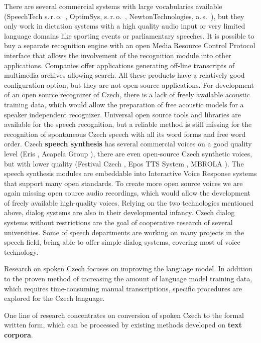 \begin{multicols}{2}
There are several commercial systems with large vocabularies available (SpeechTech s.\,r.\,o.~\cite{Note11}, OptimSys, s.\,r.\,o.~\cite{Note12}, NewtonTechnologies, a.\,s.~\cite{Note13}), but they only work in dictation systems with a high quality audio input or very limited language domains like sporting events or parliamentary speeches. It is possible to buy a separate recognition engine with an open Media Resource Control Protocol  interface that allows the involvement of the recognition module into other applications. Companies offer applications generating off-line transcripts of multimedia archives allowing search. All these products have a relatively good configuration option, but they are not open source applications. For development of an open source recognizer of Czech, there is a lack of freely available acoustic training data, which would allow the preparation of free acoustic models for a speaker independent recognizer. Universal open source tools and libraries are available for the speech recognition, but a reliable method is still missing for the recognition of spontaneous Czech speech with all its word forms and free word order.
Czech \textbf{speech synthesis} has several commercial voices on a good quality level (Eris \cite{Note11}, Acapela Group \cite{Note14}), there are even open-source Czech synthetic voices, but with lower quality (Festival Czech \cite{Note15}, Epos TTS System \cite{Note16}, MBROLA \cite{Note17}). The speech synthesis modules are embeddable into Interactive Voice Response systems that support many open standards. To create more open source voices we are again missing open source audio recordings, which would allow the development of freely available high-quality voices.
Relying on the two technologies mentioned above, dialog systems are also in their developmental infancy. Czech dialog systems without restrictions are the goal of cooperative research of several universities. Some of speech departments are working on many projects in the speech field, being able to offer simple dialog systems, covering most of voice technology.

Research on spoken Czech focuses on improving the language model. In addition to the proven method of increasing the amount of language model training data, which requires time-consuming manual transcriptions, specific procedures are explored for the Czech language.

One line of research concentrates on conversion of spoken Czech to the formal written form, which can be processed by existing methods developed on \textbf{text corpora}.


\end{multicols}

